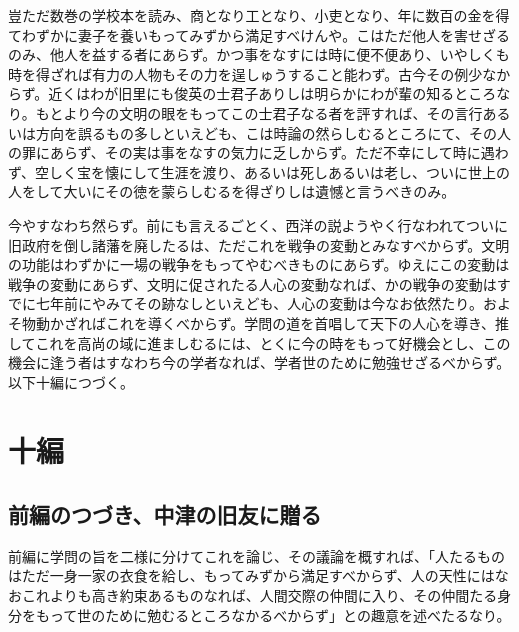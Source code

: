 \documentclass[a4paper, platex, dvipdfmx]{jsarticle}
\begin{document}
豈ただ数巻の学校本を読み、商となり工となり、小吏となり、年に数百の金を得てわずかに妻子を養いもってみずから満足すべけんや。こはただ他人を害せざるのみ、他人を益する者にあらず。かつ事をなすには時に便不便あり、いやしくも時を得ざれば有力の人物もその力を逞しゅうすること能わず。古今その例少なからず。近くはわが旧里にも俊英の士君子ありしは明らかにわが輩の知るところなり。もとより今の文明の眼をもってこの士君子なる者を評すれば、その言行あるいは方向を誤るもの多しといえども、こは時論の然らしむるところにて、その人の罪にあらず、その実は事をなすの気力に乏しからず。ただ不幸にして時に遇わず、空しく宝を懐にして生涯を渡り、あるいは死しあるいは老し、ついに世上の人をして大いにその徳を蒙らしむるを得ざりしは遺憾と言うべきのみ。

今やすなわち然らず。前にも言えるごとく、西洋の説ようやく行なわれてついに旧政府を倒し諸藩を廃したるは、ただこれを戦争の変動とみなすべからず。文明の功能はわずかに一場の戦争をもってやむべきものにあらず。ゆえにこの変動は戦争の変動にあらず、文明に促されたる人心の変動なれば、かの戦争の変動はすでに七年前にやみてその跡なしといえども、人心の変動は今なお依然たり。およそ物動かざればこれを導くべからず。学問の道を首唱して天下の人心を導き、推してこれを高尚の域に進ましむるには、とくに今の時をもって好機会とし、この機会に逢う者はすなわち今の学者なれば、学者世のために勉強せざるべからず。　　以下十編につづく。

\section{十編}
\subsection{前編のつづき、中津の旧友に贈る}
前編に学問の旨を二様に分けてこれを論じ、その議論を概すれば、「人たるものはただ一身一家の衣食を給し、もってみずから満足すべからず、人の天性にはなおこれよりも高き約束あるものなれば、人間交際の仲間に入り、その仲間たる身分をもって世のために勉むるところなかるべからず」との趣意を述べたるなり。
\end{document}
